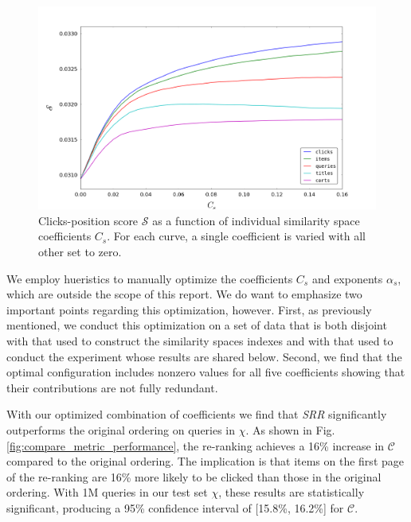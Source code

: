 \documentclass{article}
\begin{document}
\begin{figure}[htbp!]
    \centering
    \includegraphics[width=\textwidth]{000050_0_48chunk_k100_i2_n100_avg_click_position_score_0-0_16.png}
    \caption{Clicks-position score $\mathscr{S}$ as a function of individual similarity space coefficients $C_s$. For each curve, a single coefficient is varied with all other set to zero.}
    \label{fig:avg_clicks_position_score}
\end{figure}

We employ hueristics to manually optimize the coefficients $C_s$ and exponents
$\alpha_s$, which are outside the scope of this report. We do want to emphasize
two important points regarding this optimization, however. First, as previously
mentioned, we conduct this optimization on a set of data that is both disjoint
with that used to construct the similarity spaces indexes and with that used to
conduct the experiment whose results are shared below. Second, we find that the
optimal configuration includes nonzero values for all five coefficients showing
that their contributions are not fully redundant.

With our optimized combination of coefficients we find that {\em SRR}
significantly outperforms the original ordering on queries in $\chi$. As shown
in Fig.  \ref{fig:compare_metric_performance}, the re-ranking achieves a 16\%
increase in $\mathscr{C}$ compared to the original ordering. The implication is
that items on the first page of the re-ranking are 16\% more likely to be
clicked than those in the original ordering. With 1M queries in our test set
$\chi$, these results are statistically significant, producing a 95\%
confidence interval of [15.8\%, 16.2\%] for $\mathscr{C}$.
\end{document}
